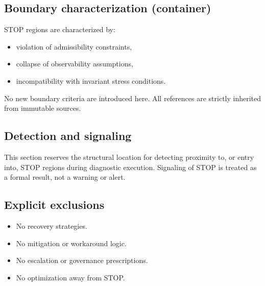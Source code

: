 \subsection{Boundary characterization (container)}
STOP regions are characterized by:
\begin{itemize}
  \item violation of admissibility constraints,
  \item collapse of observability assumptions,
  \item incompatibility with invariant stress conditions.
\end{itemize}

No new boundary criteria are introduced here.
All references are strictly inherited from immutable sources.

\subsection{Detection and signaling}
This section reserves the structural location for detecting proximity to, or entry
into, STOP regions during diagnostic execution.
Signaling of STOP is treated as a formal result, not a warning or alert.

\subsection{Explicit exclusions}
\begin{itemize}
  \item No recovery strategies.
  \item No mitigation or workaround logic.
  \item No escalation or governance prescriptions.
  \item No optimization away from STOP.
\end{itemize}

